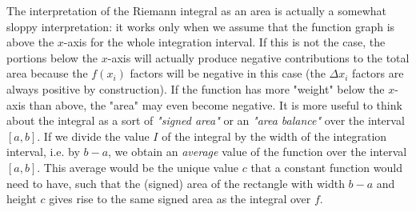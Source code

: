 \medskip
The interpretation of the Riemann integral as an area is actually a somewhat sloppy interpretation: it works only when we assume that the function graph is above the $x$-axis for the whole integration interval. If this is not the case, the portions below the $x$-axis will actually produce negative contributions to the total area because the $f(x_i)$ factors will be negative in this case (the $\Delta x_i$ factors are always positive by construction). If the function has more "weight" below the $x$-axis than above, the "area" may even become negative. It is more useful to think about the integral as a sort of \emph{"signed area"} or an \emph{"area balance"} over the interval $[a,b]$. If we divide the value $I$ of the integral by the width of the integration interval, i.e. by $b-a$, we obtain an \emph{average} value of the function over the interval $[a,b]$. This average would be the unique value $c$ that a constant function would need to have, such that the (signed) area of the rectangle with width $b-a$ and height $c$ gives rise to the same signed area as the integral over $f$.





